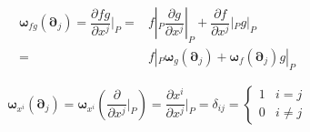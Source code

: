 \documentclass[
]{book}
\theoremstyle{definition}
\theoremstyle{definition}
\theoremstyle{definition}
\theoremstyle{definition}
\theoremstyle{remark}
\begin{document}
\[
\begin{aligned}
\boldsymbol{\omega}_{{\scriptscriptstyle fg}}\left(\boldsymbol{\partial}_{{\scriptscriptstyle j}}\right)=\dfrac{\partial fg}{\partial x^{{\scriptscriptstyle j}}}|_{{\scriptscriptstyle P}}= & f|_{{\scriptscriptstyle P}}\dfrac{\partial g}{\partial x^{{\scriptscriptstyle j}}}|_{{\scriptscriptstyle P}}+\dfrac{\partial f}{\partial x^{{\scriptscriptstyle j}}}|_{{\scriptscriptstyle P}}g|_{{\scriptscriptstyle P}}\\
= & f|_{{\scriptscriptstyle P}}\boldsymbol{\omega}_{{\scriptscriptstyle g}}\left(\boldsymbol{\partial}_{{\scriptscriptstyle j}}\right)+\boldsymbol{\omega}_{{\scriptscriptstyle f}}\left(\boldsymbol{\partial}_{{\scriptscriptstyle j}}\right)g|_{{\scriptscriptstyle P}}
\end{aligned}
\]

\[
\boldsymbol{\omega}_{{\scriptscriptstyle x}^{{\scriptscriptstyle i}}}\left(\boldsymbol{\partial}_{{\scriptscriptstyle j}}\right)=\boldsymbol{\omega}_{{\scriptscriptstyle x}^{{\scriptscriptstyle i}}}\left(\dfrac{\partial}{\partial x^{{\scriptscriptstyle j}}}|_{{\scriptscriptstyle P}}\right)=\dfrac{\partial x^{{\scriptscriptstyle i}}}{\partial x^{{\scriptscriptstyle j}}}|_{{\scriptscriptstyle P}}=\delta_{{\scriptscriptstyle ij}}=\begin{cases}
1 & i=j\\
0 & i\ne j
\end{cases}
\]
\end{document}
